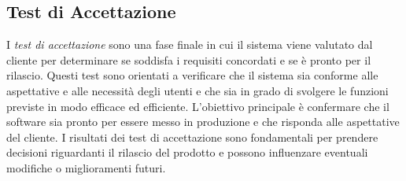 \documentclass{article}
\begin{document}
\subsection{Test di Accettazione}
I \textit{test di accettazione} sono una fase finale in cui il sistema viene valutato dal cliente per determinare se soddisfa i requisiti concordati e se è pronto per il rilascio. Questi test sono orientati a verificare che il sistema sia conforme alle aspettative e alle necessità degli utenti e che sia in grado di svolgere le funzioni previste in modo efficace ed efficiente. L'obiettivo principale è confermare che il software sia pronto per essere messo in produzione e che risponda alle aspettative del cliente. I risultati dei test di accettazione sono fondamentali per prendere decisioni riguardanti il rilascio del prodotto e possono influenzare eventuali modifiche o miglioramenti futuri.
\end{document}
